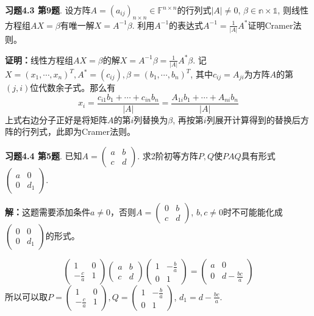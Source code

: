 \newpageorvspace

{\bf 习题4.3 第9题}. 设方阵$A = (a_{ij})_{n\times n} \in \mathbb{F}^{n\times n}$的行列式$|A| \neq 0$, $\beta\in\mathbb{n\times 1}$, 则线性方程组$AX=\beta$有唯一解$X = A^{-1}\beta$. 利用$A^{-1}$的表达式$A^{-1} = \frac{1}{|A|}A^*$证明Cramer法则。

{\bf 证明：}线性方程组$AX=\beta$的解$X = A^{-1}\beta = \frac{1}{|A|}A^*\beta$. 记$X = (x_1, \cdots, x_n)^T, A^* = (c_{ij}), \beta = (b_1, \cdots, b_n)^T$, 其中$c_{ij} = A_{ji}$为方阵$A$的第$(j,i)$位代数余子式。那么有
$$x_i = \frac{c_{i1}b_1 + \cdots + c_{in}b_n}{|A|} = \frac{A_{1i}b_1 + \cdots + A_{ni}b_n}{|A|}$$
上式右边分子正好是将矩阵$A$的第$i$列替换为$\beta$, 再按第$i$列展开计算得到的替换后方阵的行列式，此即为Cramer法则。

\newpageorvspace

{\bf 习题4.4 第5题}. 已知$A = \begin{pmatrix} a & b \\ c & d \end{pmatrix}$. 求2阶初等方阵$P,Q$使$PAQ$具有形式$\begin{pmatrix} a & 0 \\ 0 & d_1 \end{pmatrix}$.

{\bf 解：}这题需要添加条件$a\neq 0$，否则$A = \begin{pmatrix} 0 & b \\ c & d \end{pmatrix}$, $b,c\neq 0$时不可能能化成$\begin{pmatrix} 0 & 0 \\ 0 & d_1 \end{pmatrix}$的形式。

$$\begin{pmatrix} 1 & 0 \\ -\frac{c}{a} & 1 \end{pmatrix} \begin{pmatrix} a & b \\ c & d \end{pmatrix} \begin{pmatrix} 1 & -\frac{b}{a} \\ 0 & 1 \end{pmatrix} = \begin{pmatrix} a & 0 \\ 0 & d - \frac{bc}{a} \end{pmatrix}$$
所以可以取$P = \begin{pmatrix} 1 & 0 \\ -\frac{c}{a} & 1 \end{pmatrix}, Q = \begin{pmatrix} 1 & -\frac{b}{a} \\ 0 & 1 \end{pmatrix}$, $d_1 = d - \frac{bc}{a}$.

